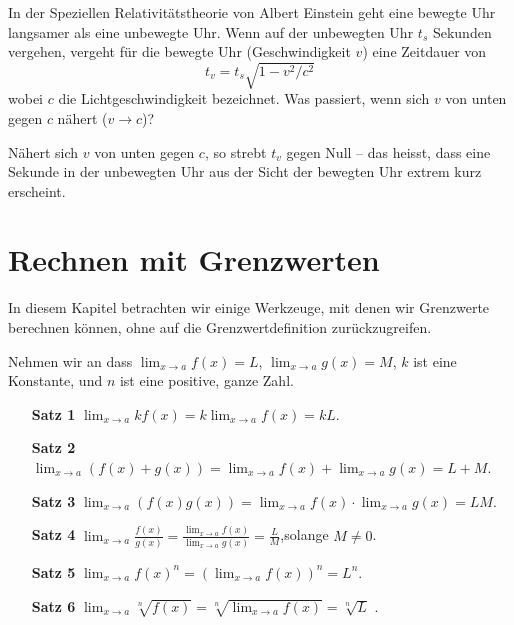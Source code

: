 \begin{exercises}
\begin{exercise}
In der Speziellen Relativitätstheorie von Albert Einstein geht eine bewegte Uhr langsamer als eine unbewegte Uhr. Wenn auf der unbewegten Uhr $t_s$ Sekunden vergehen, vergeht für die bewegte Uhr (Geschwindigkeit $v$) eine Zeitdauer von
\[
t_v = t_s \sqrt{1 - v^2/c^2}
\]
wobei $c$ die Lichtgeschwindigkeit bezeichnet. Was passiert, wenn sich $v$ von unten gegen $c$ nähert ($v\to c$)?
\begin{answer}
Nähert sich $v$ von unten gegen $c$, so strebt $t_v$ gegen Null -- das heisst, dass eine Sekunde in der unbewegten Uhr aus der Sicht der bewegten Uhr extrem kurz erscheint.
\end{answer}
\end{exercise}


\end{exercises}


\section{Rechnen mit Grenzwerten}

In diesem Kapitel betrachten wir einige Werkzeuge, mit denen wir Grenzwerte berechnen können, ohne auf die Grenzwertdefinition zurückzugreifen.


\begin{mainTheorem}[Grenzwertsätze]\label{theorem:limit-laws}
Nehmen wir an dass $\lim_{x\to a}f(x)=L$, $\lim_{x\to a}g(x)=M$, $k$
ist eine Konstante, und $n$ ist eine positive, ganze Zahl.
\begin{itemize}
\item[\textbf{Satz 1}] $\lim_{x\to a} kf(x) = k\lim_{x\to a}f(x)=kL$.
\item[\textbf{Satz 2}] $\lim_{x\to a} (f(x)+g(x)) = \lim_{x\to a}f(x)+\lim_{x\to a}g(x)=L+M$.  
\item[\textbf{Satz 3}] $\lim_{x\to a} (f(x)g(x)) = \lim_{x\to a}f(x)\cdot\lim_{x\to a}g(x)=LM$. 
\item[\textbf{Satz 4}] $\lim_{x\to a} \frac{f(x)}{g(x)} =
  \frac{\lim_{x\to a}f(x)}{\lim_{x\to a}g(x)}=\frac{L}{M}$,solange $M\ne0$.
\item[\textbf{Satz 5}] $\lim_{x\to a} f(x)^n = \left(\lim_{x\to a}f(x)\right)^n=L^n$.
\item[\textbf{Satz 6}] $\lim_{x\to a} \sqrt[n]{f(x)} = \sqrt[n]{\lim_{x\to
    a}f(x)}=\sqrt[n]{L}$ .
\end{itemize}
\label{thm:limit laws}
\end{mainTheorem}

